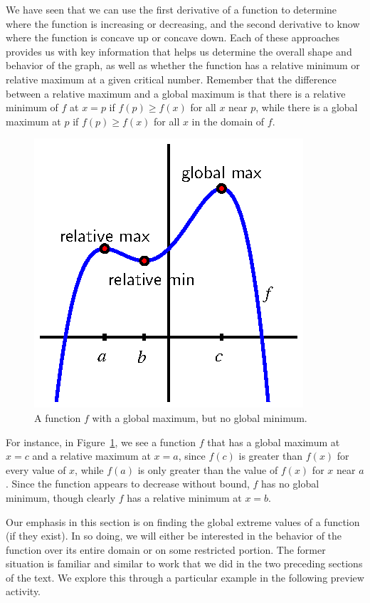 We have seen that we can use the first derivative of a function to determine where the function is increasing or decreasing, and the second derivative to know where the function is concave up or concave down.  Each of these approaches provides us with key information that helps us determine the overall shape and behavior of the graph, as well as whether the function has a relative minimum or relative maximum at a given critical number.  Remember that the difference between a relative maximum and a global maximum is that there is a relative minimum of $f$ at $x = p$ if $f(p) \ge f(x)$ for all $x$ near $p$, while there is a global maximum at $p$ if $f(p) \ge f(x)$ for all $x$ in the domain of $f$.  
\begin{figure}[h]
\begin{center}
\includegraphics{figures/3_3_Intro.eps}
\caption{A function $f$ with a global maximum, but no global minimum.} \label{F:3.3.Intro}
\end{center}
\end{figure}
For instance, in Figure~\ref{F:3.3.Intro}, we see a function $f$ that has a global maximum at $x = c$ and a relative maximum at $x = a$, since $f(c)$ is greater than $f(x)$ for every value of $x$, while $f(a)$ is only greater than the value of $f(x)$ for $x$ near $a$.  Since the function appears to decrease without bound, $f$ has no global minimum, though clearly $f$ has a relative minimum at $x = b$.

Our emphasis in this section is on finding the global extreme values of a function (if they exist).  In so doing, we will either be interested in the behavior of the function over its entire domain or on some restricted portion.  The former situation is familiar and similar to work that we did in the two preceding sections of the text.  We explore this through a particular example in the following preview activity.

